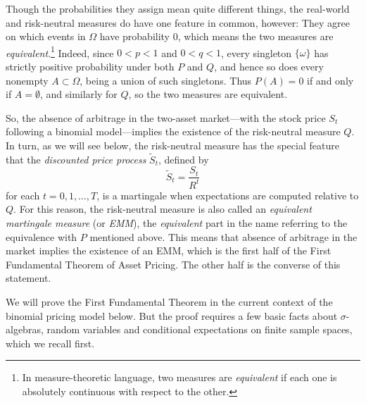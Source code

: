 \documentclass[reqno]{amsart}
\theoremstyle{definition}
\numberwithin{equation}{section}
\begin{document}
Though the probabilities they assign mean quite different things, the real-world and risk-neutral measures do have one feature in common, however: They agree on which events in $\Omega$ have probability $0$, which means the two measures are \textit{equivalent}.\footnote{In measure-theoretic language, two measures are \textit{equivalent} if each one is absolutely continuous with respect to the other.} Indeed, since $0<p<1$ and $0<q<1$, every singleton $\{\omega\}$ has strictly positive probability under both $P$ and $Q$, and hence so does every nonempty $A \subset \Omega$, being a union of such singletons. Thus $P(A)=0$ if and only if $A=\emptyset$, and similarly for $Q$, so the two measures are equivalent.

So, the absence of arbitrage in the two-asset market---with the stock price $S_t$ following a binomial model---implies the existence of the risk-neutral measure $Q$. In turn, as we will see below, the risk-neutral measure has the special feature that the \textit{discounted price process} $\tilde{S}_t$, defined by 
	\[
	\tilde{S}_t = \frac{S_t}{R^t}
	\]
for each $t=0,1,\ldots,T$, is a martingale when expectations are computed relative to $Q$. For this reason, the risk-neutral measure is also called an \textit{equivalent martingale measure} (or \textit{EMM}), the \textit{equivalent} part in the name referring to the equivalence with $P$ mentioned above. This means that absence of arbitrage in the market implies the existence of an EMM, which is the first half of the First Fundamental Theorem of Asset Pricing. The other half is the converse of this statement.

We will prove the First Fundamental Theorem in the current context of the binomial pricing model below. But the proof requires a few basic facts about $\sigma$-algebras, random variables and conditional expectations on finite sample spaces, which we recall first.
\end{document}
